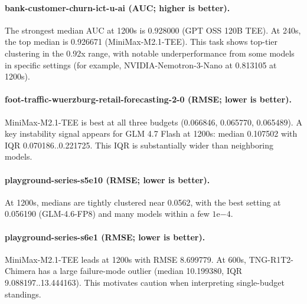 \paragraph{bank-customer-churn-ict-u-ai (AUC; higher is better).}
The strongest median AUC at 1200s is 0.928000 (GPT OSS 120B TEE).
At 240s, the top median is 0.926671 (MiniMax-M2.1-TEE).
This task shows top-tier clustering in the 0.92x range, with notable underperformance from some models in specific settings (for example, NVIDIA-Nemotron-3-Nano at 0.813105 at 1200s).

\paragraph{foot-traffic-wuerzburg-retail-forecasting-2-0 (RMSE; lower is better).}
MiniMax-M2.1-TEE is best at all three budgets (0.066846, 0.065770, 0.065489).
A key instability signal appears for GLM 4.7 Flash at 1200s: median 0.107502 with IQR 0.070186..0.221725. This IQR is substantially wider than neighboring models.

\paragraph{playground-series-s5e10 (RMSE; lower is better).}
At 1200s, medians are tightly clustered near 0.0562, with the best setting at 0.056190 (GLM-4.6-FP8) and many models within a few $1\mathrm{e}{-4}$.

\paragraph{playground-series-s6e1 (RMSE; lower is better).}
MiniMax-M2.1-TEE leads at 1200s with RMSE 8.699779.
At 600s, TNG-R1T2-Chimera has a large failure-mode outlier (median 10.199380, IQR 9.088197..13.444163). This motivates caution when interpreting single-budget standings.
